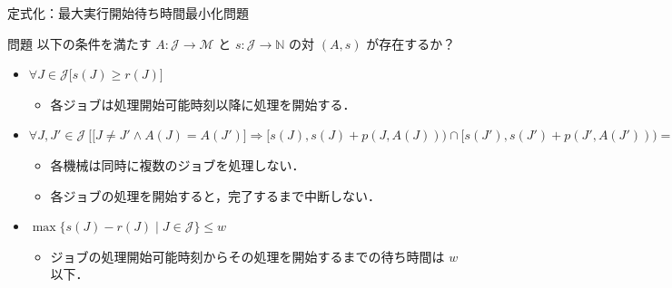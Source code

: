 \documentclass[dvipdfmx]{beamer}
\begin{document}
\begin{frame}{定式化：最大実行開始待ち時間最小化問題}
  \begin{block}{問題}
    以下の条件を満たす $A : \mathcal{J} \to \mathcal{M}$ と $s : \mathcal{J} \to \mathbb{N}$ の対 $(A,s)$ が存在するか？
    \begin{itemize}
      \item {$\forall J \in \mathcal{J}\big[s(J) \ge r(J) \big]$}
      \begin{itemize}
        \item {各ジョブは処理開始可能時刻以降に処理を開始する．}
      \end{itemize}
      \item {$\forall J, J' \in \mathcal{J}\ \Big[ \big[J\ne J' \land A(J) = A(J')\big] \Rightarrow [s(J), s(J)+p(J,A(J))) \cap[s(J'), s(J')+p(J', A(J'))) = \emptyset \Big]$}
      \begin{itemize}
        \item {各機械は同時に複数のジョブを処理しない．}
        \item {各ジョブの処理を開始すると，完了するまで中断しない．}
      \end{itemize}
      \item {$\max\big\{s(J) - r(J) \mid J \in \mathcal{J}\big\} \le w$}
      \begin{itemize}
        \item {ジョブの処理開始可能時刻からその処理を開始するまでの待ち時間は $w$ 以下．}
      \end{itemize}
    \end{itemize}
  \end{block}
\end{frame}
\end{document}
